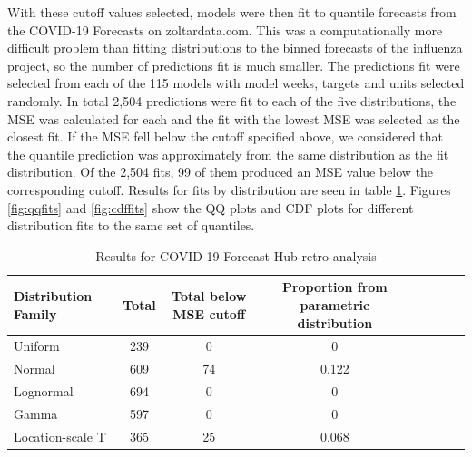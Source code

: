 \documentclass[11pt,notitlepage]{isuthesis}
\begin{document}
With these cutoff values selected, models were then fit to quantile forecasts
from the COVID-19 Forecasts on zoltardata.com. This was a computationally more
difficult problem than fitting distributions to the binned forecasts of the 
influenza project, so the number of predictions fit is much smaller. The 
predictions fit were selected from each of the 115 models with model weeks, 
targets and units selected randomly. In total 2,504 predictions were fit to each
of the five distributions, the MSE was calculated for each and the fit with the
lowest MSE was selected as the closest fit. If the MSE fell below the cutoff
specified above, we considered that the quantile prediction was approximately
from the same distribution as the fit distribution. Of the 2,504 fits, 99 of 
them produced an MSE value below the corresponding cutoff. Results for fits by
distribution are seen in table \ref{table:cresults}.
Figures \ref{fig:qqfits} and \ref{fig:cdffits} show the QQ plots and CDF plots
for different distribution fits to the same set of quantiles.


\begin{table}[h!]
  \centering
  \begin{tabular}{l*{6}{c}r}
  Distribution Family   & Total    & Total below MSE cutoff 
  & Proportion from parametric distribution\\
  \hline
  Uniform               & 239      & 0    & 0    \\
  Normal                & 609      & 74   & 0.122    \\
  Lognormal             & 694      & 0    & 0    \\
  Gamma                 & 597      & 0    & 0    \\
  Location-scale T      & 365      & 25   & 0.068    \\
  \end{tabular}
  \begin{center}
\begin{minipage}{10cm}
\captionsetup{font=scriptsize}
  \caption[COVID-19 Forecast Hub results]{Results for COVID-19 Forecast Hub
  retro analysis}
  \label{table:cresults}
  \end{minipage}
  \end{center}
\end{table}
\end{document}
